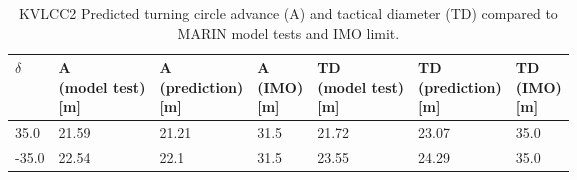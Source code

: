 \renewcommand{\cellalign}{vh}
\renewcommand{\theadalign}{vh}
\begin{table}[h]
    \centering
    \footnotesize
        \caption{KVLCC2 Predicted turning circle advance (A) and tactical diameter (TD) compared to MARIN model tests and IMO limit.}
    \label{\detokenize{06.20_results_kvlcc2:tab-kvlcc2-advance}}
    \begin{tabular}{p{0.7cm} p{1.5cm} p{1.3cm} p{1.0cm} p{1.3cm} p{1.3cm} p{1.0cm} }
\toprule
 

$\delta$
& 

\thead{A \\ (model test) \\ {[}m{]}}
& 

\thead{A \\ (prediction) \\ {[}m{]}}
& 

\thead{A \\ (IMO) \\ {[}m{]}}
& 

\thead{TD \\ (model test) \\ {[}m{]}}
& 

\thead{TD \\ (prediction) \\ {[}m{]}}
& 

\thead{TD \\ (IMO) \\ {[}m{]}}
\\
\hline

35.0
&

21.59
&

21.21
&

31.5
&

21.72
&

23.07
&

35.0
\\


-35.0
&

22.54
&

22.1
&

31.5
&

23.55
&

24.29
&

35.0
\\
\bottomrule
\end{tabular}
\end{table}
